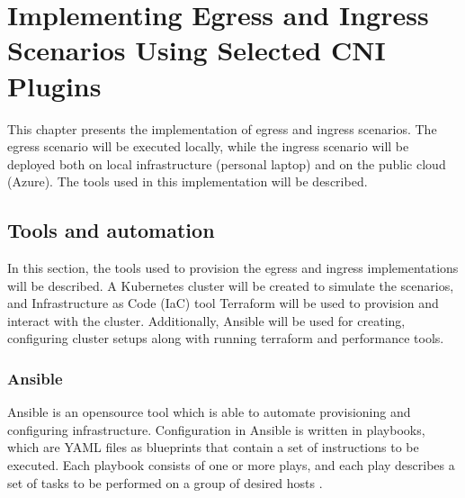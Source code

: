 \chapter{Implementing Egress and Ingress Scenarios Using Selected CNI Plugins}
\label{cha:practical_impl}

This chapter presents the implementation of egress and ingress scenarios. The egress scenario will be executed locally, while the ingress scenario will be deployed both on local infrastructure (personal laptop) and on the public cloud (Azure). The tools used in this implementation will be described.



\section{Tools and automation}
\label{sec:tools}

In this section, the tools used to provision the egress and ingress implementations will be described. A Kubernetes cluster will be created to simulate the scenarios, and Infrastructure as Code (IaC) tool Terraform will be used to provision and interact with the cluster. Additionally, Ansible will be used for creating, configuring cluster setups along with running terraform and performance tools.



\subsection{Ansible}
\label{sec:ansible}

Ansible is an opensource tool which is able to automate provisioning and configuring infrastructure. Configuration in Ansible is written in playbooks, which are YAML files as blueprints that contain a set of instructions to be executed. Each playbook consists of one or more plays, and each play describes a set of tasks to be performed on a group of desired hosts \cite{Ansible} \cite{AnsiblePlaybook}.

